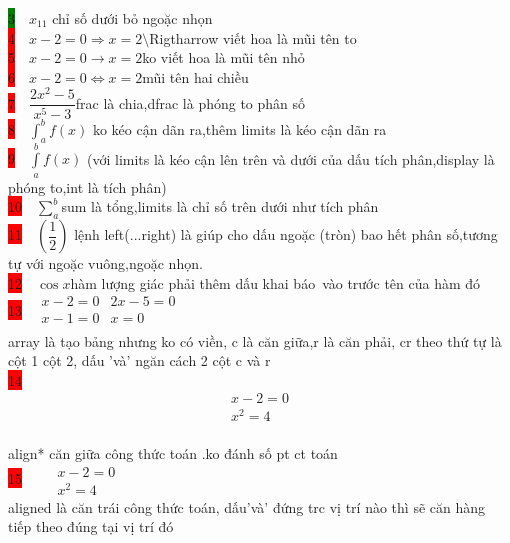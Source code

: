 \documentclass{article}
\begin{document}
\colorbox{green}{3}$\quad x_{11}$ \quad chỉ số dưới bỏ ngoặc nhọn\\

\colorbox{red}{4}$\quad  x-2=0 \Rightarrow x=2 $\quad  $\setminus$Rigtharrow viết hoa là mũi tên to\\

\colorbox{red}{5}$\quad x-2=0 \rightarrow x=2  $\quad  ko viết hoa là mũi tên nhỏ\\

\colorbox{red}{6}$\quad x-2=0 \Leftrightarrow x=2 $\quad mũi tên hai chiều\\

\colorbox{red}{7}$\quad\dfrac{2x^2-5}{x^5-3}$\quad frac là chia,dfrac là phóng to phân số\\

\colorbox{red}{8}$\quad \displaystyle\int_a^bf(x)$ \quad ko kéo cận dãn ra,thêm limits là kéo cận dãn ra\\

\colorbox{red}{9}$\quad\displaystyle\int\limits_a^bf(x)$ (với limits là kéo cận lên trên và dưới của dấu tích phân,display là phóng to,int là tích phân)\\

\colorbox{red}{10}$\quad\displaystyle\sum\limits_a^b$\quad sum là tổng,limits là chỉ số trên dưới như tích phân\\

\colorbox{red}{11}$\quad\left(\dfrac{1}{2}\right)$ \quad lệnh left(...right) là giúp cho dấu ngoặc (tròn) bao hết phân số,tương tự với ngoặc vuông,ngoặc nhọn.\\

\colorbox{red}{12}$\quad\cos x$\quad hàm lượng giác phải thêm dấu khai báo\ vào trước tên của hàm đó\\

 \colorbox{red}{13}$\quad\begin{array}{cr}
 x-2=0 & 2x-5=0\\
 x-1=0 & x=0\\
 \end{array}$\\
 array là tạo bảng nhưng ko có viền, c là căn giữa,r là căn phải, cr theo thứ tự là cột 1 cột 2, dấu 'và' ngăn cách 2 cột c và r\\
 \colorbox{red}{14}\begin{align*}
 x-2=0\\
 x^2=4
 \end{align*}\\
 align* căn giữa công thức toán .ko đánh số pt ct toán\\
\colorbox{red}{15} $\quad\begin{aligned}
 &x-2=0\\
 &x^2=4
 \end{aligned}$\\
 aligned là căn trái công thức toán, dấu'và' đứng trc vị trí nào thì sẽ căn hàng tiếp theo đúng tại vị trí đó\\
 
\end{document}
